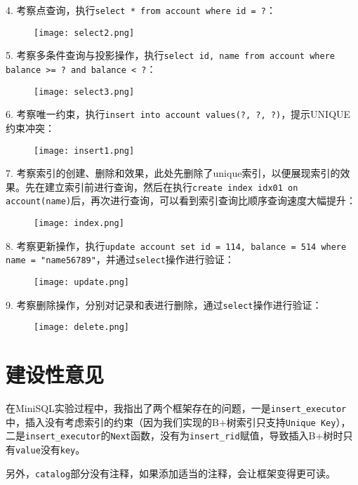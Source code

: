 \documentclass[12pt]{article}
\begin{document}
    4. 考察点查询，执行\texttt{select * from account where id = ?}：
    \begin{figure}[H]
    \centering
    \texttt{[image: select2.png]}
    \end{figure}

    5. 考察多条件查询与投影操作，执行\texttt{select id, name from account where balance >= ? and balance < ?}：
    \begin{figure}[H]
    \centering
    \texttt{[image: select3.png]}
    \end{figure}

    6. 考察唯一约束，执行\texttt{insert into account values(?, ?, ?)}，提示UNIQUE约束冲突：
    \begin{figure}[H]
    \centering
    \texttt{[image: insert1.png]}
    \end{figure}

    7. 考察索引的创建、删除和效果，此处先删除了unique索引，以便展现索引的效果。先在建立索引前进行查询，然后在执行\texttt{create index idx01 on account(name)}后，再次进行查询，可以看到索引查询比顺序查询速度大幅提升：
    \begin{figure}[H]
    \centering
    \texttt{[image: index.png]}
    \end{figure}

    8. 考察更新操作，执行\texttt{update account set id = 114, balance = 514 where name = "name56789"}，并通过\texttt{select}操作进行验证：
    \begin{figure}[H]
    \centering
    \texttt{[image: update.png]}
    \end{figure}

    9. 考察删除操作，分别对记录和表进行删除，通过\texttt{select}操作进行验证：
    \begin{figure}[H]
    \centering
    \texttt{[image: delete.png]}
    \end{figure}

    \section{建设性意见}
    在MiniSQL实验过程中，我指出了两个框架存在的问题，一是\texttt{insert\_executor}中，插入没有考虑索引的约束（因为我们实现的B+树索引只支持\texttt{Unique Key}），二是\texttt{insert\_executor}的\texttt{Next}函数，没有为\texttt{insert\_rid}赋值，导致插入B+树时只有\texttt{value}没有\texttt{key}。

    另外，\texttt{catalog}部分没有注释，如果添加适当的注释，会让框架变得更可读。
\end{document}

